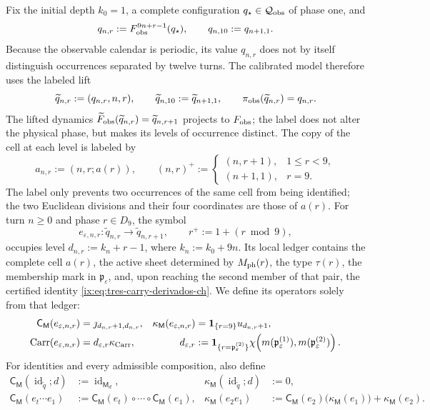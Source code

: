 Fix the initial depth \(k_0=1\), a complete configuration
\(q_\star\in\mathcal Q_{\rm obs}\) of phase one, and
\[
 q_{n,r}:=F_{\rm obs}^{9n+r-1}(q_\star),\qquad
 q_{n,10}:=q_{n+1,1}.
\]
Because the observable calendar is periodic, its value \(q_{n,r}\) does not
by itself distinguish occurrences separated by twelve turns. The calibrated
model therefore uses the labeled lift
\[
 \widetilde q_{n,r}:=(q_{n,r},n,r),\qquad
 \widetilde q_{n,10}:=\widetilde q_{n+1,1},\qquad
 \pi_{\rm obs}(\widetilde q_{n,r})=q_{n,r}.
\]
The lifted dynamics
\(\widetilde F_{\rm obs}(\widetilde q_{n,r})
=\widetilde q_{n,r+1}\) projects to \(F_{\rm obs}\); the label does not alter the physical phase, but makes its
levels of occurrence distinct. The copy of the cell at each level is labeled by
\[
 a_{n,r}:=(n,r;a(r)),\qquad
 (n,r)^+:=
 \begin{cases}
  (n,r+1),&1\le r<9,\\
  (n+1,1),&r=9.
 \end{cases}
\]
The label only prevents two occurrences of the same cell from being
identified; the two Euclidean divisions and their four coordinates are those
of \(a(r)\). For turn \(n\ge0\) and phase \(r\in D_9\), the symbol
\[
 e_{\varepsilon,n,r}:\widetilde q_{n,r}
 \longrightarrow\widetilde q_{n,r+1},
 \qquad r^+:=1+(r\bmod9),
\]
occupies level \(d_{n,r}:=k_n+r-1\), where \(k_n:=k_0+9n\). Its local ledger
contains the complete cell \(a(r)\), the active sheet determined by
\(M_{\rm ph}(r)\), the type \(\tau(r)\), the membership mark in
\(\mathfrak p_\varepsilon\), and, upon reaching the second member of that
pair, the certified identity \eqref{ix:eq:tres-carry-derivados-ch}. We define its
operators solely from that ledger:
\begin{align}
 \mathsf C_{\mathsf M}(e_{\varepsilon,n,r})
   &=\jmath_{d_{n,r}+1,d_{n,r}},&
 \kappa_{\mathsf M}(e_{\varepsilon,n,r})
   &=\mathbf1_{\{r=9\}}u_{d_{n,r}+1},
 \label{ix:eq:memoria-arista-ch}\\
       \operatorname{Carr}(e_{\varepsilon,n,r})
   &=d_{\varepsilon,r}\kappa_{\rm Carr},&
 d_{\varepsilon,r}
   &:=\mathbf1_{\{r=\mathfrak p_\varepsilon^{(2)}\}}
       \chi\!\left(m(\mathfrak p_\varepsilon^{(1)}),
                    m(\mathfrak p_\varepsilon^{(2)})\right).
 \label{ix:eq:carry-arista-derivado-ch}
\end{align}
For identities and every admissible composition, also define
\begin{align}
 \mathsf C_{\mathsf M}(\operatorname{id}_{\widetilde q};d)
   &:=\operatorname{id}_{\mathsf M_d},&
 \kappa_{\mathsf M}(\operatorname{id}_{\widetilde q};d)&:=0,
 \label{ix:eq:memoria-identidad-ch}\\
 \mathsf C_{\mathsf M}(e_t\cdots e_1)
   &:=\mathsf C_{\mathsf M}(e_t)\circ\cdots\circ
      \mathsf C_{\mathsf M}(e_1),&
 \kappa_{\mathsf M}(e_2e_1)
   &:=\mathsf C_{\mathsf M}(e_2)
        \bigl(\kappa_{\mathsf M}(e_1)\bigr)
      +\kappa_{\mathsf M}(e_2).
 \label{ix:eq:cociclo-memoria-calibrado-ch}
\end{align}
